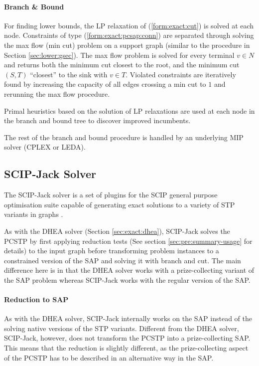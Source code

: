 \paragraph{Branch \& Bound}

For finding lower bounds, the LP relaxation of (\ref{form:exact:cut}) is solved at each node.
Constraints of type (\ref{form:exact:pcsap:conn}) are separated through solving the max flow (min cut)
problem on a support graph (similar to the procedure in Section \ref{sec:lower:gsec}). 
The max flow problem is solved for every terminal $v \in N$ and returns both the minimum cut closest to
the root, and the minimum cut $(S,T)$ ``closest'' to the sink with $v \in T$.
Violated constraints are iteratively found by increasing the
capacity of all edges crossing a min cut to $1$ and rerunning the max flow procedure.

Primal heuristics based on the solution of LP relaxations are used at each node in the branch and bound
tree to discover improved incumbents.

The rest of the branch and bound procedure is handled by an underlying MIP solver (CPLEX or LEDA).
\subsection{SCIP-Jack Solver}
\label{sec:exact:scipj}
The SCIP-Jack solver is a set of plugins for the SCIP general purpose optimisation suite capable
of generating exact solutions to a variety of STP variants in graphs \cite{gamrath2017scip}.

As with the DHEA solver (Section \ref{sec:exact:dhea}), SCIP-Jack solves the PCSTP by first applying
reduction tests (See section \ref{sec:pre:summary-usage} for details) to the input graph before transforming problem
instances to a constrained version of the SAP and solving it with branch and cut.
The main difference here is in that the DHEA solver works with a prize-collecting variant
 of the SAP problem whereas SCIP-Jack works with the regular version of the SAP.

\paragraph{Reduction to SAP}
As with the DHEA solver, SCIP-Jack internally works on the SAP instead of the solving native
versions of the STP variants. Different from the DHEA solver, SCIP-Jack, however, does not
transform the PCSTP into a prize-collecting SAP. This means that the reduction is slightly
different, as the prize-collecting aspect of the PCSTP has to be described in an alternative
way in the SAP.


